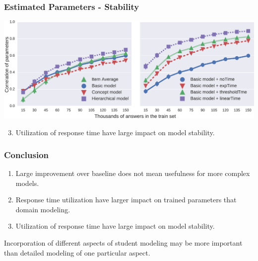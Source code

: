 \documentclass[xcolor=svgnames]{beamer}
\begin{document}
\begin{frame}
    \frametitle{Estimated Parameters - Stability}
    \includegraphics[width=\linewidth]{figures/stability}

    \begin{enumerate}
       \setcounter{enumi}{2}
        \item Utilization of response time have large impact on model stability.
    \end{enumerate}
\end{frame}
\begin{frame}
    \frametitle{Conclusion}
    \begin{enumerate}
        \item Large improvement over baseline does not mean usefulness for more complex models.
        \item Response time utilization have larger impact on trained parameters that domain modeling.
        \item Utilization of response time have large impact on model stability.
    \end{enumerate}
    Incorporation of different aspects of student modeling may be more important than detailed modeling of one particular aspect.
\end{frame}
\end{document}
